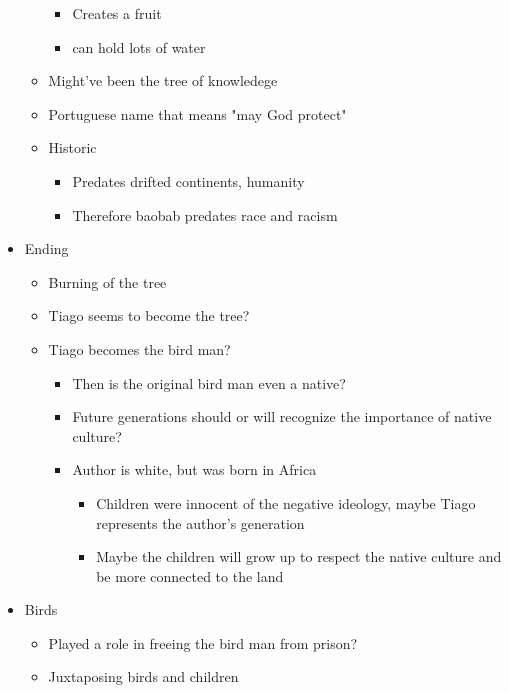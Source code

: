 \documentclass[letterpaper]{article}
\begin{document}
\begin{itemize}
\begin{itemize}
\begin{itemize}
\item Creates a fruit
\item can hold lots of water
\end{itemize}

\item Might've been the tree of knowledege
\item Portuguese name that means "may God protect"
\item Historic

\begin{itemize}
\item Predates drifted continents, humanity
\item Therefore baobab predates race and racism
\end{itemize}
\end{itemize}

\item Ending

\begin{itemize}
\item Burning of the tree
\item Tiago seems to become the tree?
\item Tiago becomes the bird man?

\begin{itemize}
\item Then is the original bird man even a native?
\item Future generations should or will recognize the importance of
native culture?
\item Author is white, but was born in Africa

\begin{itemize}
\item Children were innocent of the negative ideology, maybe Tiago
represents the author's generation
\item Maybe the children will grow up to respect the native culture
and be more connected to the land
\end{itemize}
\end{itemize}
\end{itemize}

\item Birds

\begin{itemize}
\item Played a role in freeing the bird man from prison?
\item Juxtaposing birds and children


\end{itemize}
\end{itemize}
\end{document}
